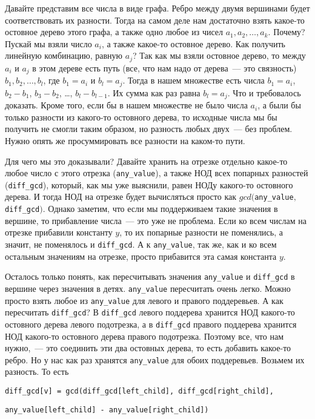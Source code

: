 Давайте представим все числа в виде графа. Ребро между двумя вершинами будет соответствовать их разности. Тогда на самом деле нам достаточно взять какое-то остовное дерево этого графа, а также одно любое из чисел $a_1, a_2, \ldots, a_k$. Почему? Пускай мы взяли число $a_i$, а также какое-то остовное дерево. Как получить линейную комбинацию, равную $a_j$?
Так как мы взяли остовное дерево, то между $a_i$ и $a_j$ в этом дереве есть путь (все, что нам надо от дерева~--- это связность) $b_1, b_2, \ldots, b_l$, где $b_1 = a_i$ и $b_l = a_j$. Тогда в нашем множестве есть числа $b_1 = a_i$, $b_2 - b_1$, $b_3 - b_2$, \ldots, $b_l - b_{l - 1}$. Их сумма как раз равна $b_l = a_j$. Что и требовалось доказать. Кроме того, если бы в нашем множестве не было числа $a_i$, а были бы только разности из какого-то остовного дерева, то исходные числа мы бы получить не смогли таким образом, но разность любых двух~--- без проблем. Нужно опять же просуммировать все разности на каком-то пути.

Для чего мы это доказывали? Давайте хранить на отрезке отдельно какое-то любое число с этого отрезка (\verb+any_value+), а также НОД всех попарных разностей (\verb+diff_gcd+), который, как мы уже выяснили, равен НОДу какого-то остовного дерева. И тогда НОД на отрезке будет вычисляться просто как $gcd($\verb+any_value+$,$\verb+diff_gcd+$)$. Однако заметим, что если мы поддерживаем такие значения в вершине, то прибавление числа~--- это уже не проблема. Если ко всем числам на отрезке прибавили константу $y$, то их попарные разности не поменялись, а значит, не поменялось и \verb+diff_gcd+. А к \verb+any_value+, так же, как и ко всем остальным значениям на отрезке, просто прибавится эта самая константа $y$.

Осталось только понять, как пересчитывать значения \verb+any_value+ и \verb+diff_gcd+ в вершине через значения в детях.
\verb+any_value+ пересчитать очень легко. Можно просто взять любое из \verb+any_value+ для левого и правого поддеревьев.
А как пересчитать \verb+diff_gcd+? В \verb+diff_gcd+ левого поддерева хранится НОД какого-то остовного дерева левого подотрезка, а в \verb+diff_gcd+ правого поддерева хранится НОД какого-то остовного дерева правого подотрезка. Поэтому все, что нам нужно,~--- это соединить эти два остовных дерева, то есть добавить какое-то ребро. Но у нас как раз хранятся \verb+any_value+ для обоих поддеревьев. Возьмем их разность.
То есть

\verb+diff_gcd[v] = gcd(diff_gcd[left_child], diff_gcd[right_child],+

\verb+any_value[left_child] - any_value[right_child])+

